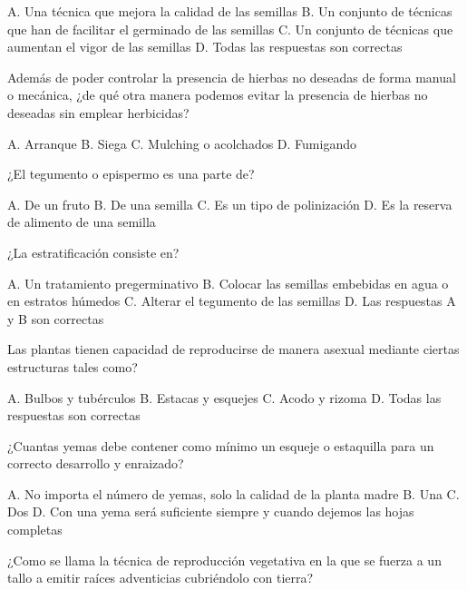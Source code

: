 \documentclass[11pt]{exam}
\begin{document}
{\begin{questions}
\begin{checkboxes}
    \choice A. Una técnica que mejora la calidad de las semillas
    \CorrectChoice B. Un conjunto de técnicas que han de facilitar el germinado de las
    semillas
    \choice C. Un conjunto de técnicas que aumentan el vigor de las semillas
    \choice D. Todas las respuestas son correctas
  \end{checkboxes}
\question Además de poder controlar la presencia de hierbas no deseadas de forma manual o
  mecánica, ¿de qué otra manera podemos evitar la presencia de hierbas no deseadas sin
  emplear herbicidas?
  \begin{checkboxes}
    \choice A. Arranque
    \choice B. Siega
    \CorrectChoice C. Mulching o acolchados
    \choice D. Fumigando
  \end{checkboxes}
\question ¿El tegumento o epispermo es una parte de?
  \begin{checkboxes}
    \choice A. De un fruto
    \CorrectChoice B. De una semilla
    \choice C. Es un tipo de polinización
    \choice D. Es la reserva de alimento de una semilla
  \end{checkboxes}
\question ¿La estratificación consiste en?
  \begin{checkboxes}
    \choice A. Un tratamiento pregerminativo
    \choice B. Colocar las semillas embebidas en agua o en estratos húmedos
    \choice C. Alterar el tegumento de las semillas
    \CorrectChoice D. Las respuestas A y B son correctas
  \end{checkboxes}
\question Las plantas tienen capacidad de reproducirse de manera asexual mediante
  ciertas estructuras tales como?
  \begin{checkboxes}
    \CorrectChoice A. Bulbos y tubérculos
    \choice B. Estacas y esquejes
    \choice C. Acodo y rizoma
    \choice D. Todas las respuestas son correctas 
  \end{checkboxes}
\question ¿Cuantas yemas debe contener como mínimo un esqueje o estaquilla para un correcto
  desarrollo y enraizado?
  \begin{checkboxes}
    \choice A. No importa el número de yemas, solo la calidad de la planta madre
    \choice B. Una
    \CorrectChoice C. Dos
    \choice D. Con una yema será suficiente siempre y cuando dejemos las hojas completas
  \end{checkboxes}
\question ¿Como se llama la técnica de reproducción vegetativa en la que se
  fuerza a un tallo a emitir raíces adventicias cubriéndolo con tierra?
  \begin{checkboxes}

\end{checkboxes}
\end{questions}}
\end{document}
